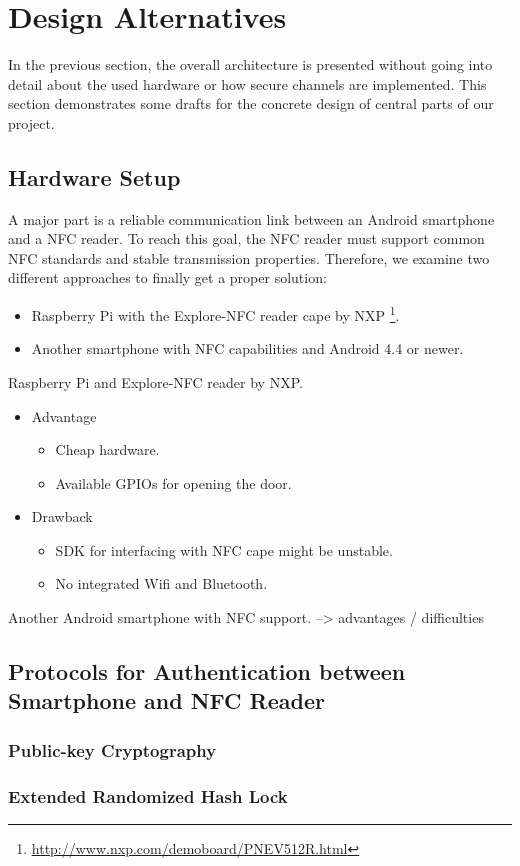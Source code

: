 \section{Design Alternatives}
In the previous section, the overall architecture is presented without going into detail about the used hardware or how secure channels are implemented.
This section demonstrates some drafts for the concrete design of central parts of our project. 

\subsection{Hardware Setup}
A major part is a reliable communication link between an Android smartphone and a NFC reader.
To reach this goal, the NFC reader must support common NFC standards and stable transmission properties.
Therefore, we examine two different approaches to finally get a proper solution:
\begin{itemize}
	\item Raspberry Pi with the Explore-NFC reader cape by NXP \footnote{\url{http://www.nxp.com/demoboard/PNEV512R.html}}.
	\item Another smartphone with NFC capabilities and Android 4.4 or newer.
\end{itemize}

Raspberry Pi and Explore-NFC reader by NXP.
\begin{itemize}
	\item Advantage
	\begin{itemize}
		\item Cheap hardware.
		\item Available GPIOs for opening the door.
	\end{itemize}
	\item Drawback
	\begin{itemize}
		\item SDK for interfacing with NFC cape might be unstable.
		\item No integrated Wifi and Bluetooth.
	\end{itemize}
\end{itemize}

Another Android smartphone with NFC support.
--> advantages / difficulties

\subsection{Protocols for Authentication between Smartphone and NFC Reader}

\subsubsection{Public-key Cryptography}

\subsubsection{Extended Randomized Hash Lock}
